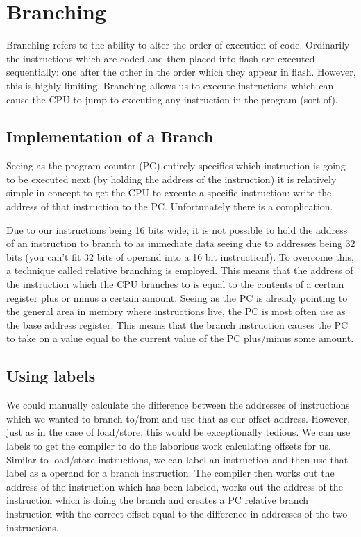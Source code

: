 \chapter{Branching}
Branching refers to the ability to alter the order of execution of code. Ordinarily the instructions which are coded and then placed into flash are executed sequentially: one after the other in the order which they appear in flash. However, this is highly limiting. Branching allows us to execute instructions which can cause the CPU to jump to executing any instruction in the program (sort of). 

\section{Implementation of a Branch}
Seeing as the program counter (PC) entirely specifies which instruction is going to be executed next (by holding the address of the instruction) it is relatively simple in concept to get the CPU to execute a specific instruction: write the address of that instruction to the PC. Unfortunately there is a complication.

Due to our instructions being 16 bits wide, it is not possible to hold the address of an instruction to branch to as immediate data seeing due to addresses being 32 bits (you can't fit 32 bits of operand into a 16 bit instruction!).
To overcome this, a technique called relative branching is employed. This means that the address of the instruction which the CPU branches to is equal to the contents of a certain register plus or minus a certain amount. Seeing as the PC is already pointing to the general area in memory where instructions live, the PC is most often use as the base address register. This means that the branch instruction causes the PC to take on a value equal to the current value of the PC plus/minus some amount. 

\section{Using labels}
We could manually calculate the difference between the addresses of instructions which we wanted to branch to/from and use that as our offset address. However, just as in the case of load/store, this would be exceptionally tedious. We can use labels to get the compiler to do the laborious work calculating offsets for us. Similar to load/store instructions, we can label an instruction and then use that label as a operand for a branch instruction. The compiler then works out the address of the instruction which has been labeled, works out the address of the instruction which is doing the branch and creates a PC relative branch instruction with the correct offset equal to the difference in addresses of the two instructions. 

